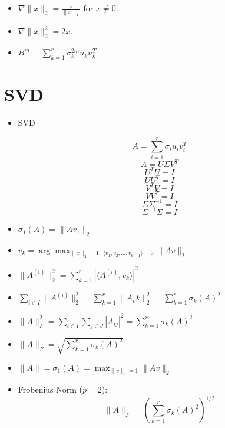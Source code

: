 \documentclass{article}
\begin{document}
\begin{itemize}
\begin{itemize}
\end{itemize}

\item $
\nabla \|x\|_2 = \frac{x}{\|x\|_2} \text{ for } x \neq 0.
$

\item $
\nabla \|x\|^2_2 = 2x.
$

\item $
B^m = \sum_{k=1}^{r} \sigma_k^{2m} u_k u_k^T
$

\end{itemize}



\section{SVD}

\begin{itemize}

\item SVD

\[
A = \sum_{i=1}^r \sigma_i u_i v_i^T
\]
\[
A = U \Sigma V^T
\]
\[
U^T U = I
\]
\[
U U^T = I
\]
\[
V^T V = I
\]
\[
V V^T = I
\]
\[
\Sigma \Sigma^{-1} = I
\]
\[
\Sigma^{-1} \Sigma = I
\]

\item 
$
\sigma_1(A) = \|Av_1\|_2
$


\item 
$
v_k = \arg \max_{\|x\|_2=1,\; \langle v_1,v_2,\ldots,v_{k-1} \rangle=0} \|Av\|_2
$

\item    $
    \| A^{(i)} \|_2^2 = \sum_{k=1}^{r} | \langle A^{(i)}, v_k \rangle |^2
    $

\item 
$
    \sum_{i \in I} \| A^{(i)} \|_2^2 = \sum_{k=1}^{r} \| A_v k \|_2^2 = \sum_{k=1}^{r} \sigma_k(A)^2
$

\item
   $
    \| A \|_F^2 = \sum_{i \in I} \sum_{j \in J} | A_{ij} |^2 = \sum_{k=1}^{r} \sigma_k(A)^2
  $

\item 
    $
    \| A \|_F = \sqrt{ \sum_{k=1}^{r} \sigma_k(A)^2 }
   $

\item 
$
\|A\| = \sigma_1(A) = \max_{\|v\|_2=1} \|Av\|_2
$

\item Frobenius Norm ($p = 2$):
        \[
        \|A\|_F = \left( \sum_{k=1}^r \sigma_k(A)^2 \right)^{1/2}
        \]


\end{itemize}
\end{document}
